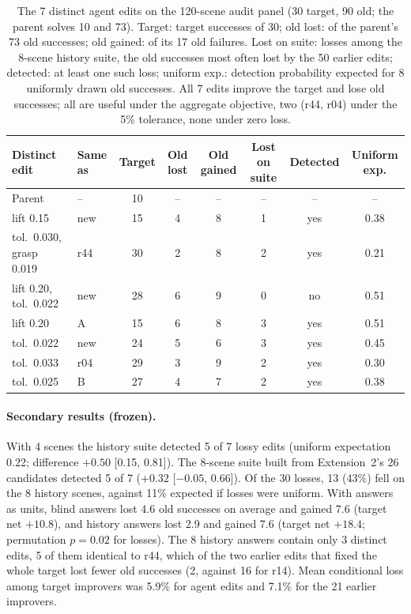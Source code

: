 \documentclass[letterpaper]{article} %
\begin{document}
\begin{table}[t]
\centering
\small
\begin{tabular}{llcccccc}
\toprule
Distinct edit & Same as & Target & Old lost & Old gained & Lost on suite & Detected & Uniform exp. \\
\midrule
Parent & -- & 10 & -- & -- & -- & -- & -- \\
lift 0.15 & new & 15 & 4 & 8 & 1 & yes & 0.38 \\
tol.\ 0.030, grasp 0.019 & r44 & 30 & 2 & 8 & 2 & yes & 0.21 \\
lift 0.20, tol.\ 0.022 & new & 28 & 6 & 9 & 0 & no & 0.51 \\
lift 0.20 & A & 15 & 6 & 8 & 3 & yes & 0.51 \\
tol.\ 0.022 & new & 24 & 5 & 6 & 3 & yes & 0.45 \\
tol.\ 0.033 & r04 & 29 & 3 & 9 & 2 & yes & 0.30 \\
tol.\ 0.025 & B & 27 & 4 & 7 & 2 & yes & 0.38 \\
\bottomrule
\end{tabular}
\caption{The 7 distinct agent edits on the 120-scene audit panel (30 target, 90 old; the parent solves 10 and 73). Target: target successes of 30; old lost: of the parent's 73 old successes; old gained: of its 17 old failures. Lost on suite: losses among the 8-scene history suite, the old successes most often lost by the 50 earlier edits; detected: at least one such loss; uniform exp.: detection probability expected for 8 uniformly drawn old successes. All 7 edits improve the target and lose old successes; all are useful under the aggregate objective, two (r44, r04) under the 5\% tolerance, none under zero loss.}
\label{tab:agentedits}
\end{table}

\paragraph{Secondary results (frozen).} With 4 scenes the history suite detected 5 of 7 lossy edits (uniform expectation 0.22; difference $+0.50$ [0.15, 0.81]). The 8-scene suite built from Extension~2's 26 candidates detected 5 of 7 ($+0.32$ [$-0.05$, 0.66]). Of the 30 losses, 13 (43\%) fell on the 8 history scenes, against 11\% expected if losses were uniform. With answers as units, blind answers lost 4.6 old successes on average and gained 7.6 (target net $+10.8$), and history answers lost 2.9 and gained 7.6 (target net $+18.4$; permutation $p=0.02$ for losses). The 8 history answers contain only 3 distinct edits, 5 of them identical to r44, which of the two earlier edits that fixed the whole target lost fewer old successes (2, against 16 for r14). Mean conditional loss among target improvers was 5.9\% for agent edits and 7.1\% for the 21 earlier improvers.
\end{document}
